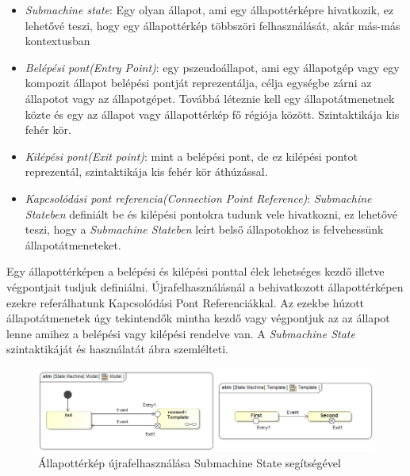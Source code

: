 \begin{itemize}
	\item \emph{Submachine state}: Egy olyan állapot, ami egy állapottérképre hivatkozik, ez lehetővé teszi, hogy egy állapottérkép többszöri felhasználását, akár más-más kontextusban
	\item \emph{Belépési pont(Entry Point)}: egy pszeudoállapot, ami egy állapotgép vagy egy kompozit állapot belépési pontját reprezentálja, célja egységbe zárni az állapotot vagy az állapotgépet. Továbbá léteznie kell egy állapotátmenetnek közte és egy az állapot vagy állapottérkép fő régiója között. Szintaktikája kis fehér kör.
	\item \emph{Kilépési pont(Exit point)}: mint a belépési pont, de ez kilépési pontot reprezentál, szintaktikája kis fehér kör áthúzással.
	\item \emph{Kapcsolódási pont referencia(Connection Point Reference)}: \emph{Submachine Stateben} definiált be és kilépési pontokra tudunk vele hivatkozni, ez lehetővé teszi, hogy a \emph{Submachine Stateben} leírt belső állapotokhoz is felvehessünk állapotátmeneteket.
	
\end{itemize}
Egy állapottérképen a belépési és kilépési ponttal élek lehetséges kezdő illetve végpontjait tudjuk definiálni. Újrafelhasználásnál a behivatkozott állapottérképen ezekre referálhatunk Kapcsolódási Pont Referenciákkal. Az ezekbe húzott állapotátmenetek úgy tekintendők mintha kezdő vagy végpontjuk az az állapot lenne amihez a belépési vagy kilépési rendelve van. A \emph{Submachine State} szintaktikáját és használatát   ábra szemlélteti.
\begin{figure}[!ht]
	\centering
	\includegraphics[keepaspectratio, width=150mm]{figures/statechart_elements/SubmachineState.png}
	\caption{Állapottérkép újrafelhasználása Submachine State segítségével}
	\label{fig:SubmachineState}
\end{figure}
